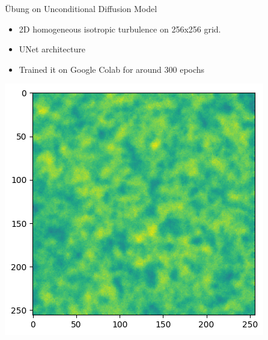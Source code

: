 \documentclass[./main.tex]{subfiles}
\begin{document}
\begin{frame}[label={sec:org00bc5ad}]{Übung on Unconditional Diffusion Model}
\begin{itemize}
\item 2D homogeneous isotropic turbulence on 256x256 grid.
\item UNet architecture
\item Trained it on Google Colab for around 300 epochs
\end{itemize}
\begin{adjustbox}{width=\textwidth,totalheight=0.6\paperheight,keepaspectratio,center}
\includegraphics[width=\textwidth]{./figs/Kolmogorov3.png}
\end{adjustbox}
\end{frame}
\end{document}
